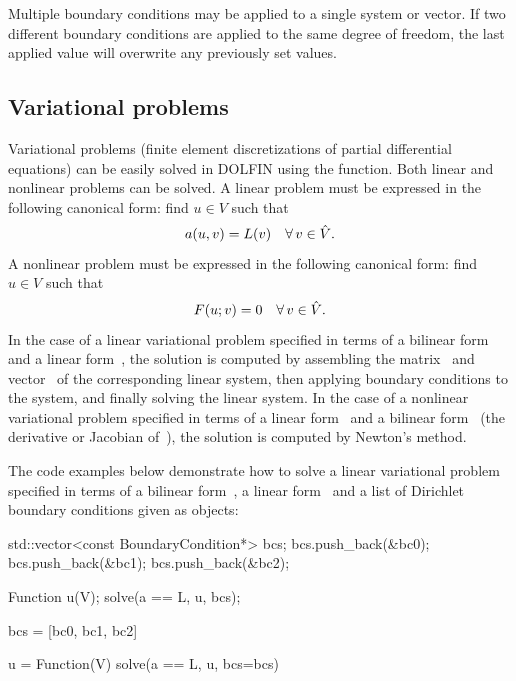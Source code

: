Multiple boundary conditions may be applied to a single system or
vector. If two different boundary conditions are applied to the same
degree of freedom, the last applied value will overwrite any
previously set values.

\subsection{Variational problems}

Variational problems (finite element discretizations of partial
differential equations) can be easily solved in DOLFIN using the
 function. Both linear and nonlinear problems can be
solved. A linear problem must be expressed in the following canonical
form: find $u \in V$ such that
\begin{equation}
  a(u, v) = L(v) \quad \forall\, v \in \hat{V}.
\end{equation}
A nonlinear problem must be expressed in the following canonical form:
find $u \in V$ such that
\begin{equation}
  F(u; v) = 0 \quad \forall\, v \in \hat{V}.
\end{equation}
In the case of a linear variational problem specified in terms of a
bilinear form~ and a linear form~, the solution is
computed by assembling the matrix~ and vector~ of the
corresponding linear system, then applying boundary conditions to the
system, and finally solving the linear system. In the case of a
nonlinear variational problem specified in terms of a linear
form~ and a bilinear form~ (the derivative or Jacobian
of~), the solution is computed by Newton's method.


The code examples below demonstrate how to solve a linear variational
problem specified in terms of a bilinear form~, a linear
form~ and a list of Dirichlet boundary conditions given as
 objects:
\begin{c++}
std::vector<const BoundaryCondition*> bcs;
bcs.push_back(&bc0);
bcs.push_back(&bc1);
bcs.push_back(&bc2);

Function u(V);
solve(a == L, u, bcs);
\end{c++}
\begin{python}
bcs = [bc0, bc1, bc2]

u = Function(V)
solve(a == L, u, bcs=bcs)
\end{python}

